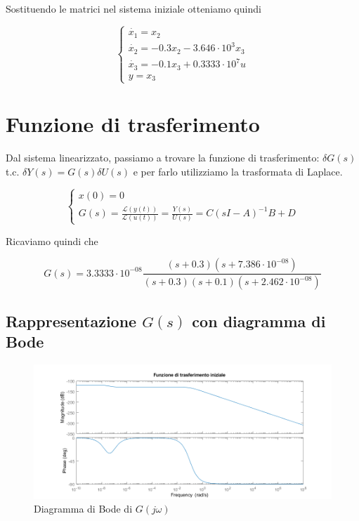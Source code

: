 \documentclass{article}
\begin{document}
\noindent
Sostituendo le matrici nel sistema iniziale otteniamo quindi
\begin{large}
\[
\begin{cases}
\dot{x_1}=x_2\\
\dot{x_2}=-0.3x_2-3.646\cdot10^3 x_3\\
\dot{x_3}=-0.1 x_3+0.3333\cdot10^7 u\\
y=x_3
\end{cases}
\]
\end{large}

\section{Funzione di trasferimento}
Dal sistema linearizzato, passiamo a trovare la funzione di trasferimento: $\delta G(s)$ t.c. $\delta{Y} (s) = G(s)\delta{U} (s)$ e per farlo utilizziamo la trasformata di Laplace.

\begin{large}
\[
\begin{cases}
x(0)=0 \\
G(s)=\frac{\mathcal{L}(y(t))}{\mathcal{L}(u(t))}=\frac{Y(s)}{U(s)}=C(sI-A)^{-1} B +D
\end{cases}
\]
\end{large}
\noindent
Ricaviamo quindi che
\begin{large}
\[
G(s) = 3.3333\cdot 10^{-08}\frac{(s+0.3) (s+7.386\cdot 10^{-08})} {(s+0.3) (s+0.1) (s+2.462\cdot 10^{-08})}
\]
\end{large}



\subsection{Rappresentazione $G(s)$ con diagramma di Bode}

\begin{figure}[!h]
\centering
\includegraphics[width=1\textwidth]{grafici/fig1.png}
\caption{\label{fig:bode}Diagramma di Bode di $G(j\omega)$}
\end{figure}
\newpage
\end{document}
